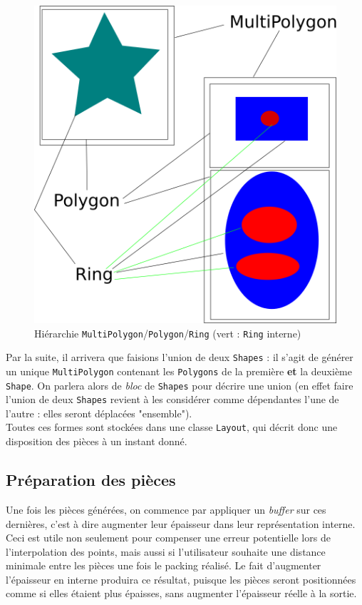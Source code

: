 \begin{figure}[!htb]
\centering
\includegraphics[scale=0.5]{img/MultiPolygon.png}
\caption{Hiérarchie \texttt{MultiPolygon}/\texttt{Polygon}/\texttt{Ring} (vert : \texttt{Ring} interne)}
\label{fig:multipolygon}
\end{figure}

Par la suite, il arrivera que faisions l'union de deux \texttt{Shapes} : il s'agit de générer un unique \texttt{MultiPolygon} contenant les \texttt{Polygons} de la première \textbf{et} la deuxième \texttt{Shape}. On parlera alors de \textit{bloc} de \texttt{Shapes} pour décrire une union (en effet faire l'union de deux \texttt{Shapes} revient à les considérer comme dépendantes l'une de l'autre : elles seront déplacées "ensemble").\\

Toutes ces formes sont stockées dans une classe \texttt{Layout}, qui décrit donc une disposition des pièces à un instant donné.\\

\subsection{Préparation des pièces}

Une fois les pièces générées, on commence par appliquer un \textit{buffer} sur ces dernières, c'est à dire augmenter leur épaisseur dans leur représentation interne. Ceci est utile non seulement pour compenser une erreur potentielle lors de l'interpolation des points, mais aussi si l'utilisateur souhaite une distance minimale entre les pièces une fois le packing réalisé. Le fait d'augmenter l'épaisseur en interne produira ce résultat, puisque les pièces seront positionnées comme si elles étaient plus épaisses, sans augmenter l'épaisseur réelle à la sortie.\\

